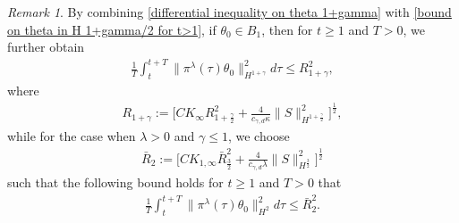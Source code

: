 \documentclass[reqno]{amsart}%
\theoremstyle{definition}
\theoremstyle{remark}
\numberwithin{equation}{section}
\newtheorem{remark}[theorem]{Remark}
\newcommand{\1}{\mathbf{1}}
\newcommand{\K}{K_{\infty}}
\newcommand{\pin}{\pi^{\lambda}}
\numberwithin{equation}{section}
\numberwithin{theorem}{section}
\numberwithin{figure}{section}
\begin{document}
\begin{remark}
By combining \eqref{differential inequality on theta 1+gamma} with \eqref{bound on theta in H 1+gamma/2 for t>1}, if $\theta_0\in B_1$, then for $t\ge1$ and $T>0$, we further obtain
\begin{align}\label{bound on time integral on theta in H 1+gamma}
\frac{1}{T}\int_{t}^{t+T}\|\pin(\tau)\theta_0\|^2_{H^{1+\gamma}}d\tau\le R_{1+\gamma}^2,
\end{align}
where
\begin{align*}
R_{1+\gamma}:=\Big[C\K R_{1+\frac{\gamma}{2}}^2+\frac{4}{c_{\gamma,d}\kappa}\|S\|^2_{H^{1+\frac{\gamma}{2}}}\Big]^\frac{1}{2},
\end{align*}
while for the case when $\lambda>0$ and $\gamma\le1$, we choose
\begin{align*}
\bar{R}_{2}:=\Big[CK_{1,\infty} \bar{R}_{\frac{3}{2}}^2+\frac{4}{c_{\gamma,d}\lambda}\|S\|^2_{H^{\frac{3}{2}}}\Big]^\frac{1}{2}
\end{align*}
such that the following bound holds for $t\ge1$ and $T>0$ that
\begin{align}\label{bound on time integral on theta in H 1+gamma gamma=1}
\frac{1}{T}\int_{t}^{t+T}\|\pin(\tau)\theta_0\|^2_{H^{2}}d\tau\le \bar{R}_{2}^2.
\end{align}
\end{remark}
\end{document}
